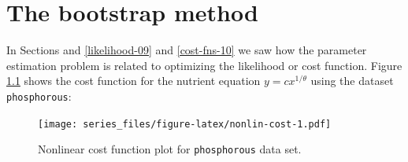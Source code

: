 \documentclass[
]{book}
\newenvironment{Shaded}{\begin{snugshade}}{\end{snugshade}}
\newcommand{\AttributeTok}[1]{\textcolor[rgb]{0.77,0.63,0.00}{#1}}
\newcommand{\CommentTok}[1]{\textcolor[rgb]{0.56,0.35,0.01}{\textit{#1}}}
\newcommand{\ConstantTok}[1]{\textcolor[rgb]{0.00,0.00,0.00}{#1}}
\newcommand{\DecValTok}[1]{\textcolor[rgb]{0.00,0.00,0.81}{#1}}
\newcommand{\FloatTok}[1]{\textcolor[rgb]{0.00,0.00,0.81}{#1}}
\newcommand{\FunctionTok}[1]{\textcolor[rgb]{0.00,0.00,0.00}{#1}}
\newcommand{\NormalTok}[1]{#1}
\newcommand{\OtherTok}[1]{\textcolor[rgb]{0.56,0.35,0.01}{#1}}
\newcommand{\SpecialCharTok}[1]{\textcolor[rgb]{0.00,0.00,0.00}{#1}}
\theoremstyle{definition}
\theoremstyle{definition}
\theoremstyle{definition}
\theoremstyle{remark}
\begin{document}
\hypertarget{bootstrap-11}{%
\chapter{The bootstrap method}\label{bootstrap-11}}

In Sections and \ref{likelihood-09} and \ref{cost-fns-10} we saw how the parameter estimation problem is related to optimizing the likelihood or cost function. Figure \ref{fig:nonlin-cost} shows the cost function for the nutrient equation \(\displaystyle y = c x^{1/\theta}\) using the dataset \texttt{phosphorous}:

\begin{Shaded}
\end{Shaded}

\begin{figure}
\centering
\texttt{[image: series\_files/figure-latex/nonlin-cost-1.pdf]}
\caption{\label{fig:nonlin-cost}Nonlinear cost function plot for \texttt{phosphorous} data set.}
\end{figure}
\end{document}
